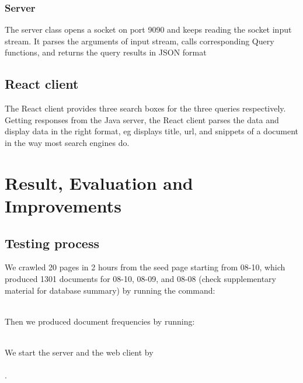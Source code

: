 \documentclass{article}
\begin{document}
\subsubsection{Server}
The server class opens a socket on port 9090 and keeps reading the socket input stream. It parses the arguments of input stream, calls corresponding Query functions, and returns the query results in JSON format

\subsection{React client}
The React client provides three search boxes for the three queries respectively. Getting responses from the Java server, the React client parses the data and display data in the right format, eg displays title, url, and snippets of a document in the way most search engines do.  

\section{Result, Evaluation and Improvements}
\subsection{Testing process}
We crawled 20 pages in 2 hours from the seed page starting from 08-10, which produced 1301 documents for 08-10, 08-09, and 08-08 (check supplementary material for database summary) by running the command: \\ \\
\texttt{}

Then we produced document frequencies by running: \\ \\
\texttt{}
\texttt{}
\texttt{}

We start the server and the web client by \\ \\
  \texttt{}
  \texttt{}.
\end{document}
